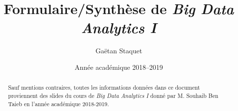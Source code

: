 \documentclass[usenames,dvipsnames]{article}
\title{Formulaire/Synthèse de \textit{Big Data Analytics I}}
\author{Gaëtan Staquet}
\date{Année académique 2018--2019}
\begin{document}
    \maketitle

    \begin{abstract}
        Sauf mentions contraires, toutes les informations données dans ce document proviennent des slides du cours de \textit{Big Data Analytics I} donné par M. Souhaib Ben Taieb en l'année académique 2018-2019.
    \end{abstract}

    \tableofcontents

    \clearpage
    
    
    
    
    
    
    
    
    

    \clearpage
    \printindex{}
    \clearpage
    \printnomenclature

    \clearpage
    \printbibliography{}
\end{document}
